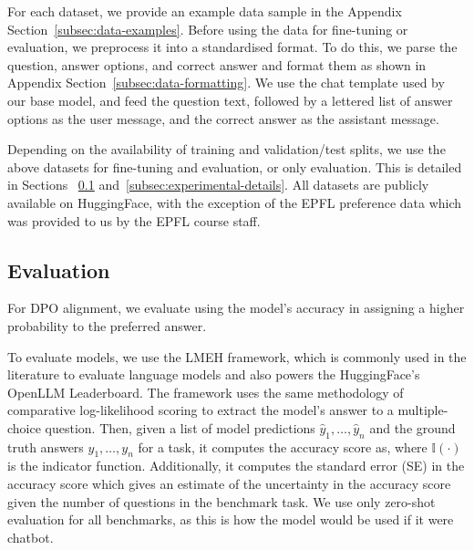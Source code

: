 For each dataset, we provide an example data sample in the Appendix
Section~\ref{subsec:data-examples}. Before using the data for fine-tuning or
evaluation, we preprocess it into a standardised format. To do this, we
parse the question, answer options, and correct answer and format them as shown in Appendix Section~\ref{subsec:data-formatting}. We use the chat template used by our base model, and feed the question text, followed by a lettered list of answer options as the user message, and the correct answer as the assistant message.

Depending on the availability of training and validation/test splits, we use
the above datasets for fine-tuning and evaluation, or only evaluation. This is detailed in Sections ~\ref{subsec:evaluation} and~\ref{subsec:experimental-details}. All datasets are publicly available on HuggingFace, with the exception of the EPFL preference data which was provided to us by the EPFL course staff.


\subsection{Evaluation}
\label{subsec:evaluation}


For DPO alignment, we evaluate using the model's accuracy in assigning a higher probability to the preferred answer.

To evaluate models, we use the LMEH framework, which is commonly used in the literature to evaluate language models and also powers the
HuggingFace's OpenLLM Leaderboard. The framework uses the same methodology of
comparative log-likelihood scoring to extract the model's answer to a
multiple-choice question. Then, given a list of model predictions $\hat{y}_1,
\dots, \hat{y}_n$ and the ground truth answers $y_1, \dots, y_n$ for a task, it
computes the accuracy score as, where $\mathbb{I}(\cdot)$ is the indicator function. Additionally, it computes
the standard error (SE) in the accuracy score which gives an estimate of the uncertainty in the accuracy score given the number
of questions in the benchmark task. We use only zero-shot evaluation for all
benchmarks, as this is how the model would be used if it were chatbot.

